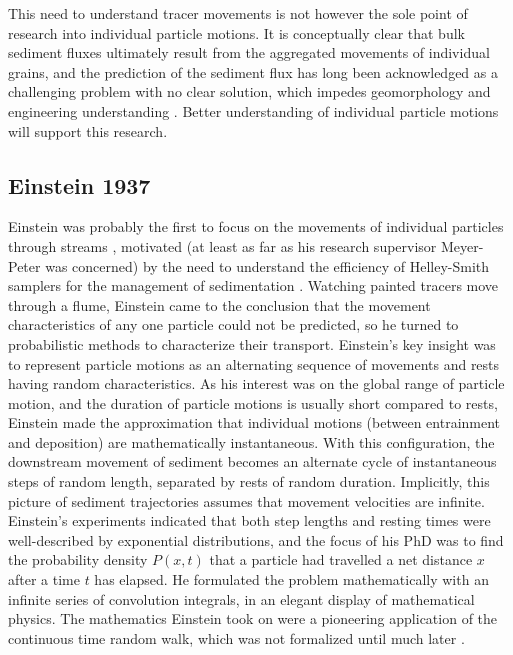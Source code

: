 This need to understand tracer movements is not however the sole point of research into individual particle motions. It is conceptually clear that bulk sediment fluxes ultimately result from the aggregated movements of individual grains, and the prediction of the sediment flux has long been acknowledged as a challenging problem with no clear solution, which impedes geomorphology and engineering understanding \citep{Ancey2020,Ancey2020a}. Better understanding of individual particle motions will support this research.


\subsection{Einstein 1937}
Einstein was probably the first to focus on the movements of individual particles through streams \citep{Einstein1937}, motivated (at least as far as his research supervisor Meyer-Peter was concerned) by the need to understand the efficiency of Helley-Smith samplers for the management of sedimentation \citep{Ettema2004}.
Watching painted tracers move through a flume, Einstein came to the conclusion that the movement characteristics of any one particle could not be predicted, so he turned to probabilistic methods to characterize their transport.
Einstein's key insight was to represent particle motions as an alternating sequence of movements and rests having random characteristics.
As his interest was on the global range of particle motion, and the duration of particle motions is usually short compared to rests, Einstein made the approximation that individual motions (between entrainment and deposition) are mathematically instantaneous.
With this configuration, the downstream movement of sediment becomes an alternate cycle of instantaneous steps of random length, separated by rests of random duration. 
Implicitly, this picture of sediment trajectories assumes that movement velocities are infinite.
Einstein's experiments indicated that both step lengths and resting times were well-described by exponential distributions, and the focus of his PhD was to find the probability density $P(x,t)$ that a particle had travelled a net distance $x$ after a time $t$ has elapsed. He formulated the problem mathematically with an infinite series of convolution integrals, in an elegant display of mathematical physics. 
The mathematics Einstein took on were a pioneering application of the continuous time random walk, which was not formalized until much later \citep{Montroll1965}.


